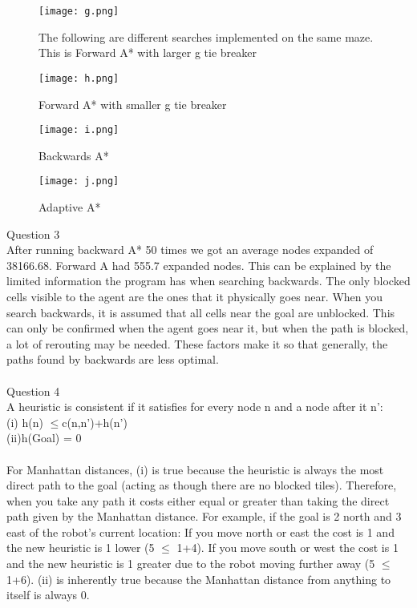 \documentclass{article}
\begin{document}
  \begin{figure} 
  \texttt{[image: g.png]}
  \caption{ The following are different searches implemented on the same maze.  This is Forward A* with larger g tie breaker}
\end{figure}
\begin{figure} 
\texttt{[image: h.png]}
\caption{ Forward A* with smaller g tie breaker}
\end{figure}
\begin{figure} 
  \texttt{[image: i.png]}
  \caption{ Backwards A*}
 \end{figure}
    \begin{figure} 
  \texttt{[image: j.png]}
  \caption{Adaptive A*}
 \end{figure}
\clearpage
Question 3
\\
After running backward A* 50 times we got an average nodes expanded of 38166.68.  Forward A had 555.7 expanded nodes.  This can be explained by the limited information the program has when searching backwards.  The only blocked cells visible to the agent are the ones that it physically goes near.  When you search backwards, it is assumed that all cells near the goal are unblocked.  This can only be confirmed when the agent goes near it, but when the path is blocked, a lot of rerouting may be needed.  These factors make it so that generally, the paths found by backwards are less optimal.  
\\\\
Question 4
\\
A heuristic is consistent if it satisfies for every node n and a node after it n’:\\
	(i) h(n) $\leq$c(n,n’)+h(n’)\\
	(ii)h(Goal) = 0\\\\
	For Manhattan distances, (i) is true because the heuristic is always the most direct path to the goal (acting as though there are no blocked tiles).  Therefore, when you take any path it costs either equal or greater than taking the direct path given by the Manhattan distance.  For example, if the goal is 2 north and 3 east of the robot’s current location: If you move north or east the cost is 1 and the new heuristic is 1 lower (5 $\leq$ 1+4).  If you move south or west the cost is 1 and the new heuristic is 1 greater due to the robot moving further away (5 $\leq$ 1+6).  (ii) is inherently true because the Manhattan distance from anything to itself is always 0.  
\\\\
\end{document}
